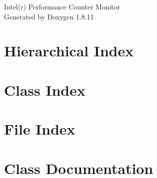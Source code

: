 \documentclass[twoside]{book}
\newcommand{\+}{\discretionary{\mbox{\scriptsize$\hookleftarrow$}}{}{}}
\newcommand{\clearemptydoublepage}{%
  \newpage{\pagestyle{empty}\cleardoublepage}%
}
\begin{document}
\begin{titlepage}
\vspace*{7cm}
\begin{center}%
{\Large Intel(r) Performance Counter Monitor }\\
\vspace*{1cm}
{\large Generated by Doxygen 1.8.11}\\
\end{center}
\end{titlepage}
\clearemptydoublepage
\tableofcontents
\clearemptydoublepage
{}

\chapter{Hierarchical Index}

\chapter{Class Index}

\chapter{File Index}

\chapter{Class Documentation}












































\end{document}
